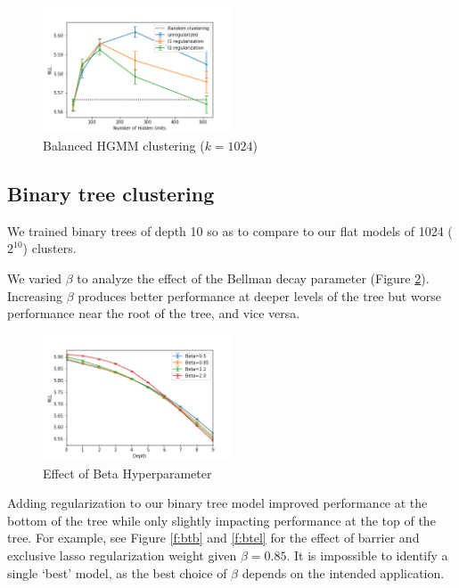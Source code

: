 \documentclass[11pt,letterpaper]{article}
\begin{document}
\begin{figure}
  \caption{Balanced HGMM clustering ($k=1024$)}
\label{f:fbgmm}
  \centering
    \includegraphics[width=0.5\textwidth]{flat_bgmm.png}
\end{figure}

\subsection{Binary tree clustering}

We trained binary trees of depth 10 so as to compare to our flat models of 1024 ($2^{10}$) clusters.

We varied $\beta$ to analyze the effect of the Bellman decay parameter (Figure \ref{f:beta}). Increasing $\beta$ produces better performance at deeper levels of the tree but worse performance near the root of the tree, and vice versa.

\begin{figure}
  \caption{Effect of Beta Hyperparameter}
\label{f:beta}
  \centering
    \includegraphics[width=0.5\textwidth]{skipgram_tree.png}
\end{figure}

Adding regularization to our binary tree model improved performance at the bottom of the tree while only slightly impacting performance at the top of the tree. For example, see Figure \ref{f:btb} and \ref{f:btel} for the effect of barrier and exclusive lasso regularization weight given $\beta=0.85$. It is impossible to identify a single `best' model, as the best choice of $\beta$ depends on the intended application.
\end{document}
